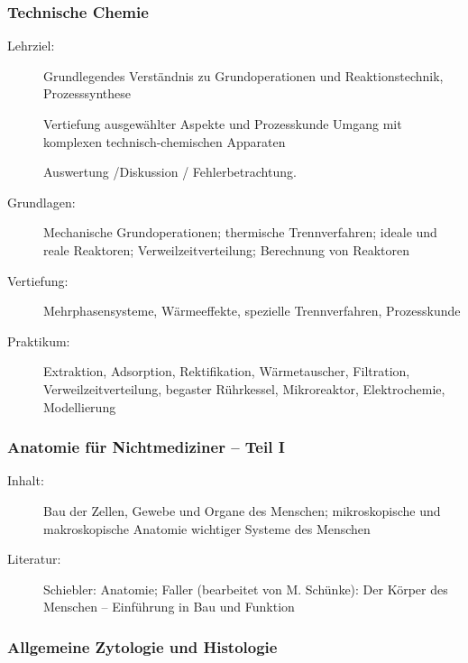 \documentclass[%
a4paper, %
11pt,               %
leqno,              %
fleqn,              %
]
{scrartcl}
\begin{document}

\subsubsection{Technische Chemie} %
\label{ssub:Technische Chemie}

\begin{description}
  \item[Lehrziel:] Grundlegendes Verständnis zu Grundoperationen und
    Reaktionstechnik, Prozesssynthese

    Vertiefung ausgewählter Aspekte und Prozesskunde
    Umgang mit komplexen technisch-chemischen Apparaten

    Auswertung /Diskussion / Fehlerbetrachtung.
  \item[Grundlagen:] Mechanische Grundoperationen; thermische Trennverfahren;
    ideale und reale Reaktoren; Verweilzeitverteilung; Berechnung von Reaktoren
  \item[Vertiefung:] Mehrphasensysteme, Wärmeeffekte, spezielle Trennverfahren,
    Prozesskunde
  \item[Praktikum:] Extraktion, Adsorption, Rektifikation, Wärmetauscher,
    Filtration, Verweilzeitverteilung, begaster Rührkessel, Mikroreaktor,
    Elektrochemie, Modellierung
\end{description}


\subsubsection{Anatomie für Nichtmediziner -- Teil I} %
\label{ssub:Anatomie für Nichtmediziner -- Teil I}

\begin{description}
  \item[Inhalt:] Bau der Zellen, Gewebe und Organe des Menschen; mikroskopische
    und makroskopische Anatomie wichtiger Systeme des Menschen
  \item[Literatur:] Schiebler: Anatomie; Faller (bearbeitet von M. Schünke): Der
    Körper des Menschen -- Einführung in Bau und Funktion
\end{description}


\subsubsection{Allgemeine Zytologie und Histologie} %
\label{ssub:Allg. Zytologie und Histologie}
\end{document}
